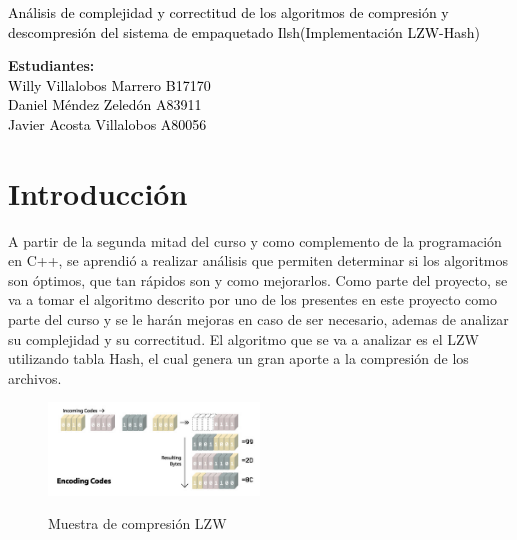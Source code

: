 \documentclass[letterpaper]{article}
\newcommand{\uic}{black} %
\newcommand{\uim}{} %
\newcommand{\userinput}[1]{\textcolor{\uic}{\uim#1\uim}}
\begin{document}
\vspace*{2cm}

\begin{center}
\Huge
\userinput{Análisis de complejidad y correctitud de los algoritmos de compresión y descompresión del sistema de empaquetado Ilsh(Implementación LZW-Hash)}
\vspace*{1cm}
\end{center}

\noindent
\small\baselineskip=14pt
\textbf{Estudiantes:} \\
\userinput{Willy Villalobos Marrero B17170}\\
\userinput{Daniel Méndez Zeledón A83911}\\
\userinput{Javier Acosta Villalobos A80056}\\

\section{Introducción}

A partir de la segunda mitad del curso y como complemento de la programación en C++, se aprendió a realizar análisis que permiten determinar si los algoritmos son óptimos, que tan rápidos son y como mejorarlos. Como parte del proyecto, se va a tomar el algoritmo descrito por uno de los presentes en este proyecto como parte del curso y se le harán mejoras en caso de ser necesario, ademas de analizar su complejidad y su correctitud. El algoritmo que se va a analizar es el LZW utilizando tabla Hash, el cual genera un gran aporte a la compresión de los archivos.\\

\begin{figure}[h!]
	\centering
	\includegraphics[width=0.5\textwidth]{lzw.jpg}
	\label{fig1}
	\caption{Muestra de compresión LZW}
\end{figure}
\end{document}
